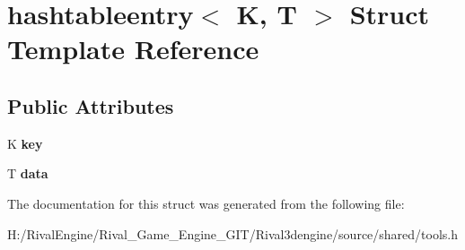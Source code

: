 \hypertarget{structhashtableentry}{}\section{hashtableentry$<$ K, T $>$ Struct Template Reference}
\label{structhashtableentry}
\subsection*{Public Attributes}
\begin{DoxyCompactItemize}
\item 
\mbox{\label{structhashtableentry_ad882a0848d9cf60d65916707996b0789}} 
K {\bfseries key}
\item 
\mbox{\label{structhashtableentry_ac8b0c1b7a31e26f61f8eabdeffc5cf71}} 
T {\bfseries data}
\end{DoxyCompactItemize}


The documentation for this struct was generated from the following file\+:\begin{DoxyCompactItemize}
\item 
H\+:/\+Rival\+Engine/\+Rival\+\_\+\+Game\+\_\+\+Engine\+\_\+\+G\+I\+T/\+Rival3dengine/source/shared/tools.\+h\end{DoxyCompactItemize}
